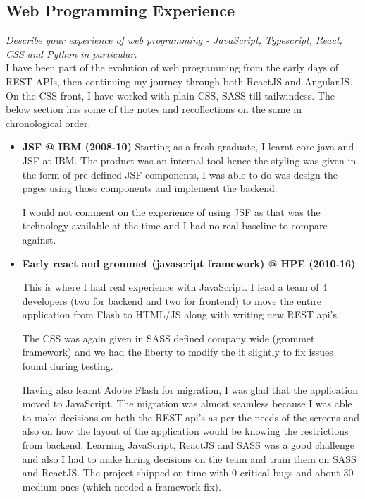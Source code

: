 \documentclass{article}
\begin{document}
\subsection{Web Programming Experience}
\small \textit{Describe your experience of web programming - JavaScript, Typescript, React, CSS and Python in particular.}\\[1em]
\normalsize 
I have been part of the evolution of web programming from the early days of REST APIs, then continuing my journey through both ReactJS and AngularJS. On the CSS front, I have worked with plain CSS, SASS till tailwindcss. The below section has some of the notes and recollections on the same in chronological order.
\begin{itemize}
    \item \textbf{JSF @ IBM (2008-10)} 
    Starting as a fresh graduate, I learnt core java and JSF at IBM. The product was an internal tool hence the styling was 
    given in the form of pre defined JSF components, I was able to do was design the pages using those components and implement
     the backend. 
     
     I would not comment on the experience of using JSF as that was the technology available at the time and I 
     had no real baseline to compare against.
    
    \item \textbf{Early react and grommet (javascript framework) @ HPE (2010-16)} 
    
    This is where I had real experience with JavaScript. I lead a team of 4 developers (two for backend and two for frontend) 
    to move the entire application from Flash to HTML/JS along with writing new REST api's.

    The CSS was again given in SASS defined company wide (grommet framework) and we had the liberty to modify the it slightly to fix 
    issues found during testing. 

    Having also learnt Adobe Flash for migration, I was glad that the application moved to JavaScript. The migration was almost
    seamless because I was able to make decisions on both the REST api's as per the needs of the screens and also on how the 
    layout of the application would be knowing the restrictions from backend. Learning JavaScript, ReactJS and SASS
    was a good challenge and also I had to make hiring decisions on the team and train them on SASS and ReactJS. The project
    shipped on time with 0 critical bugs and about 30 medium ones (which needed a framework fix).
    

\end{itemize}
\end{document}
